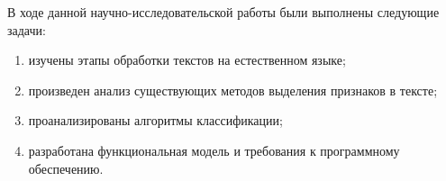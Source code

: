 \Conclusion %

В ходе данной научно-исследовательской работы были выполнены следующие задачи:

\begin{enumerate}
	\item изучены этапы обработки текстов на естественном языке;
    \item произведен анализ существующих методов выделения признаков в тексте;
    \item проанализированы алгоритмы классификации;
    \item разработана функциональная модель и требования к программному обеспечению.
\end{enumerate}
